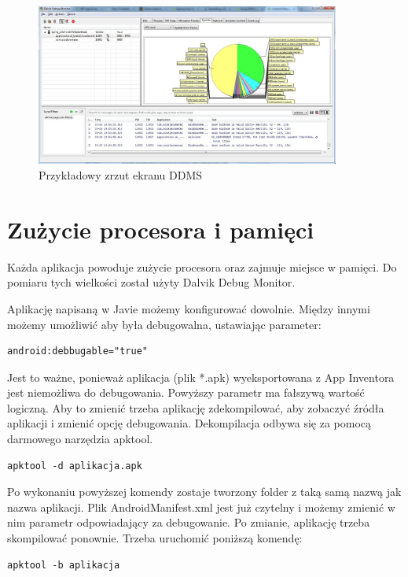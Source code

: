 \begin{figure}[th] 
\centering\includegraphics[width=10cm]{figures/dalvik}
\caption{Przykładowy zrzut ekranu DDMS}
\end{figure}

\section{Zużycie procesora i pamięci}

Każda aplikacja powoduje zużycie procesora oraz zajmuje miejsce w pamięci. Do pomiaru tych wielkości został użyty Dalvik Debug Monitor.


Aplikację napisaną w Javie możemy konfigurować dowolnie. Między innymi możemy umożliwić aby była debugowalna, ustawiając parameter:

\begin{lstlisting}
android:debbugable="true"
\end{lstlisting}

Jest to ważne, ponieważ aplikacja (plik *.apk) wyeksportowana z App Inventora jest niemożliwa do debugowania. Powyższy parametr ma fałszywą wartość logiczną. Aby to zmienić trzeba aplikację zdekompilować, aby zobaczyć źródła aplikacji i zmienić opcję debugowania. Dekompilacja odbywa się za pomocą darmowego narzędzia apktool.

\begin{lstlisting}
apktool -d aplikacja.apk
\end{lstlisting}

Po wykonaniu powyższej komendy zostaje tworzony folder z taką samą nazwą jak nazwa aplikacji. Plik AndroidManifest.xml jest już czytelny i możemy zmienić w nim parametr odpowiadający za debugowanie. Po zmianie, aplikację trzeba skompilować ponownie. Trzeba uruchomić poniższą komendę:

\begin{lstlisting}
apktool -b aplikacja
\end{lstlisting}

